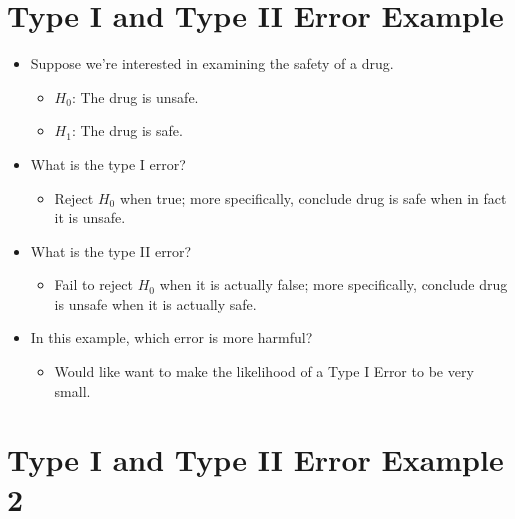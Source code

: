 \documentclass[12pt]{article}
\begin{document}
\section{Type I and Type II Error
Example}\label{type-i-and-type-ii-error-example}

\begin{itemize}
\itemsep1pt\parskip0pt
\item
  Suppose we're interested in examining the safety of a drug.

  \begin{itemize}
  \itemsep1pt\parskip0pt
  \item
    \(H_{0}\): The drug is unsafe.
  \item
    \(H_{1}\): The drug is safe.
  \end{itemize}
\item
  What is the type I error?

  \begin{itemize}
  \itemsep1pt\parskip0pt
  \item
    Reject \(H_{0}\) when true; more specifically, conclude drug is safe
    when in fact it is unsafe.
  \end{itemize}
\item
  What is the type II error?

  \begin{itemize}
  \itemsep1pt\parskip0pt
  \item
    Fail to reject \(H_{0}\) when it is actually false; more
    specifically, conclude drug is unsafe when it is actually safe.
  \end{itemize}
\item
  In this example, which error is more harmful?

  \begin{itemize}
  \itemsep1pt\parskip0pt
  \item
    Would like want to make the likelihood of a Type I Error to be very
    small.
  \end{itemize}
\end{itemize}

\section{Type I and Type II Error Example
2}\label{type-i-and-type-ii-error-example-2}
\end{document}
